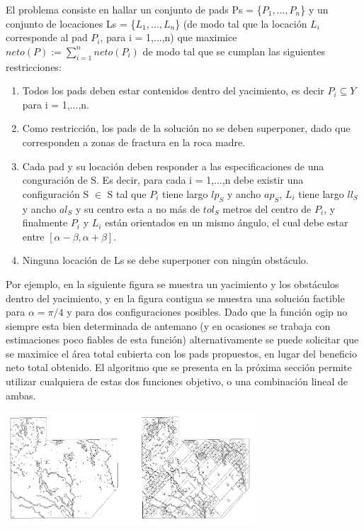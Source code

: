 El problema consiste en hallar un conjunto de pads Ps = \{$P_1, ... ,P_n$\} y un conjunto de locaciones Ls = \{$L_1, ..., L_n$\} (de modo tal que la locaci\'on $L_i$ corresponde al pad $P_i$, para i = 1,...,n) que maximice $neto(P) :=  \sum_{i=1}^{n} neto(P_i) $ de modo tal que se cumplan las siguientes restricciones:

\begin{enumerate}
\item Todos los pads deben estar contenidos dentro del yacimiento, es decir $P_i \subseteq Y$ para i = 1,...,n.
\item Como restricci\'on, los pads de la soluci\'on no se deben superponer, dado que corresponden a zonas de fractura en la roca madre.
\item Cada pad y su locaci\'on deben responder a las especificaciones de una conguraci\'on de S. Es decir, para cada i = 1,...,n debe existir una configuraci\'on S $\in$ S tal que $P_i$ tiene largo $lp_S$ y ancho $ap_S$, $L_i$ tiene largo $ll_S$ y ancho $al_S$ y su centro esta a no m\'as de $tol_S$ metros del centro de $P_i$, y finalmente $P_i$ y $L_i$ est\'an orientados en un mismo \'angulo, el cual debe estar entre $[\alpha - \beta, \alpha + \beta]$.
\item Ninguna locaci\'on de Ls se debe superponer con ning\'un obst\'aculo.
\end{enumerate}


Por ejemplo, en la siguiente figura se muestra un yacimiento y los obst\'aculos dentro del yacimiento, y en la figura contigua se muestra una soluci\'on factible para $\alpha = \pi / 4$ y para dos configuraciones posibles. Dado que la funci\'on ogip no siempre esta bien determinada de antemano (y en ocasiones se trabaja con estimaciones poco fiables de esta funci\'on) alternativamente se puede solicitar que se maximice el \'area total cubierta con los pads propuestos, en lugar del beneficio neto total obtenido. El algoritmo que se presenta en la pr\'oxima secci\'on permite utilizar cualquiera de estas dos funciones objetivo, o una combinaci\'on lineal de ambas.



\begin{center}
\includegraphics[width=0.7\textwidth]{imagenes/figura7}
\end{center}

